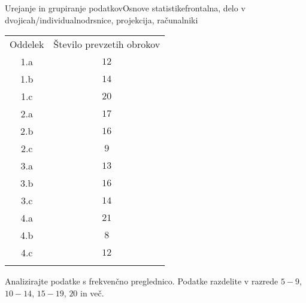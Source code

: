 \begin{priprava}{2}{}{Urejanje in grupiranje podatkov}{Osnove statistike}{frontalna, delo v dvojicah/individualno}{drsnice, projekcija, računalniki}
\begin{naloga}
                            \begin{table}[H]
                                \centering
                                \begin{tabular}{||c|c||} 
                                \hhline{|t:==:t|}
                                \rowcolor[rgb]{0.843,0.718,0.718} 
                                Oddelek  & Število prevzetih obrokov   \\ 
                                \hhline{|:==:|}
                                1.a & $12$    \\ 
                                \hline
                                1.b & $14$    \\ 
                                \hline
                                1.c & $20$    \\ 
                                \hline
                                2.a & $17$     \\
                                \hline
                                2.b & $16$     \\
                                \hline
                                2.c & $9$     \\
                                \hline
                                3.a & $13$     \\
                                \hline
                                3.b & $16$     \\
                                \hline
                                3.c & $14$     \\
                                \hline
                                4.a & $21$     \\                    
                                \hline
                                4.b  & $8$     \\
                                \hline
                                4.c  & $12$     \\
                                \hhline{|b:==:b|}
                                \end{tabular}
                            \end{table}
                        
                        Analizirajte podatke s frekvenčno preglednico.
                        Podatke razdelite v razrede $5-9$, $10-14$, $15-19$, $20$ in več.
                    \end{naloga}

                


\end{priprava}
